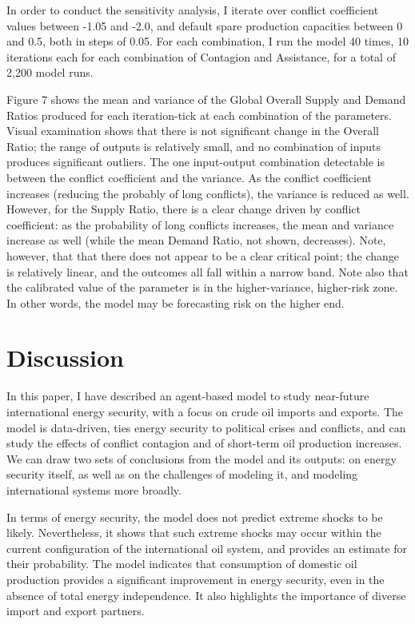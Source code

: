 \documentclass{llncs}
\begin{document}
In order to conduct the sensitivity analysis, I iterate over conflict coefficient values between -1.05 and -2.0, and default spare production capacities between 0 and 0.5, both in steps of 0.05. For each combination, I run the model 40 times, 10 iterations each for each combination of Contagion and Assistance, for a total of 2,200 model runs. 


Figure 7 shows the mean and variance of the Global Overall Supply and Demand Ratios produced for each iteration-tick at each combination of the parameters. Visual examination shows that there is not significant change in the Overall Ratio; the range of outputs is relatively small, and no combination of inputs produces significant outliers. The one input-output combination detectable is between the conflict coefficient and the variance. As the conflict coefficient increases (reducing the probably of long conflicts), the variance is reduced as well. However, for the Supply Ratio, there is a clear change driven by conflict coefficient: as the probability of long conflicts increases, the mean and variance increase as well (while the mean Demand Ratio, not shown, decreases). Note, however, that that there does not appear to be a clear critical point; the change is relatively linear, and the outcomes all fall within a narrow band. Note also that the calibrated value of the parameter is in the higher-variance, higher-risk zone. In other words, the model may be forecasting risk on the higher end. 



\section{Discussion}

In this paper, I have described an agent-based model to study near-future international energy security, with a focus on crude oil imports and exports. The model is data-driven, ties energy security to political crises and conflicts, and can study the effects of conflict contagion and of short-term oil production increases. We can draw two sets of conclusions from the model and its outputs: on energy security itself, as well as on the challenges of modeling it, and modeling international systems more broadly.

In terms of energy security, the model does not predict extreme shocks to be likely. Nevertheless, it shows that such extreme shocks may occur within the current configuration of the international oil system, and provides an estimate for their probability. The model indicates that consumption of domestic oil production provides a significant improvement in energy security, even in the absence of total energy independence. It also highlights the importance of diverse import and export partners. 
\end{document}
